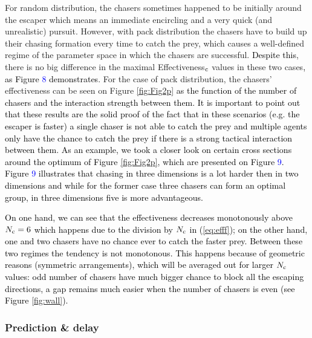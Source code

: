 \documentclass[12pt,a4paper,final]{iopart}
\newcommand{\revision}{\textcolor{black}}
\newcommand{\revisiontwo}{\textcolor{black}}
\begin{document}
For random distribution, the chasers sometimes happened to be initially around the escaper which means an immediate encircling and a very quick (and unrealistic) pursuit. However, with pack distribution the chasers have to build up their chasing formation every time to catch the prey, which causes a well-defined regime of the parameter space in which the chasers are successful. \revision{Despite this}, there is no big difference in the maximal Effectiveness$_{\rm c}$ values in these two cases\revision{, as Figure \textcolor{blue} 8 demonstrates}. For the case of pack distribution, the chasers' effectiveness can be seen on Figure \ref{fig:Fig2p} \revision{as the function of the number of chasers and the interaction strength between them. It is important to point out that these results are the solid proof of the fact that in these scenarios (e.g. the escaper is faster) a single chaser is not able to catch the prey  and multiple agents only have the chance to catch the prey if there is a strong tactical interaction between them. As an example, we took a closer look on certain cross sections around the optimum of Figure \ref{fig:Fig2p}, which are presented on Figure \textcolor{blue}{9}.  Figure \textcolor{blue}{9} illustrates that chasing in three dimensions is a lot harder then in two dimensions and while for the former case three chasers can form an optimal group, in three dimensions five is more advantageous. }

\revision{On one hand, we can see that the effectiveness decreases monotonously above $N_{\revisiontwo{\rm c}} = 6$ which happens due to the division by $N_{\revisiontwo{\rm c}}$ in (\ref{eq:efff}); on the other hand, one and two chasers have no chance ever to catch the faster prey. Between these two regimes the tendency is not monotonous. This happens because of geometric reasons (symmetric arrangements), which will be averaged out for larger $N_{\revisiontwo{\rm c}}$ values: odd number of chasers have much bigger chance to block all the escaping directions, a gap remains much easier when the number of chasers is even (see Figure \ref{fig:wall}).}










\subsubsection{Prediction \& delay}
\end{document}
